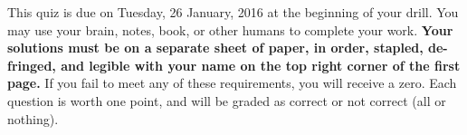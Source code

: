 \documentclass[12pt]{article}
\title{%
	}
\author{}
\date{}
\begin{document}
\maketitle

\vspace{-7pc}
 This quiz is due on Tuesday, 26 January, 2016 at the beginning of your drill.  You may use your brain, notes, book, or other humans to complete your work.  \textbf{Your solutions must be on a separate sheet of paper, in order, stapled, de-fringed, and legible with your name on the top right corner of the first page.}  If you fail to meet any of these requirements, you will receive a zero.  Each question is worth one point, and will be graded as correct or not correct (all or nothing).

\noindent\hrulefill
\end{document}
